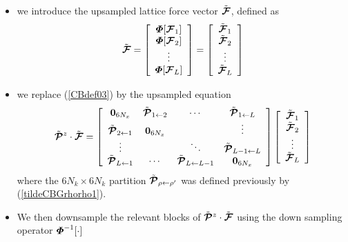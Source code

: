 \begin{itemize}
\item we introduce the upsampled lattice force vector $\tilde{\CB F}$, 
defined as
\[
\tilde{\CB F}=
\left[\begin{array}{c}
{\bmi \Phi}[{\CB F}_{1}]\\ {\bmi \Phi}[{\CB F}_{2}]\\
\vdots\\
{\bmi \Phi}[{\CB F}_{L}]  \end{array}  \right]
=
\left[\begin{array}{c}
\tilde{\CB F}_{1}\\ \tilde{\CB F}_{2}\\
\vdots\\
\tilde{\CB F}_{L}  \end{array}  \right]
\]
\item we replace  (\ref{CBdef03})  by the upsampled equation
\begin{equation} \label{tildeCBdef3}
\tilde{\CB P}{}^{z}\cdot \tilde{\CB F}=\left[{\begin{array}{cccc}
{\bf 0}_{6N_x}&\tilde{\CB P}_{1 
\leftarrow   2}&\cdots &\tilde{\CB P}_{1 \leftarrow   L}\\ \tilde{\CB P}_{2 
\leftarrow   1}&{\bf 0}_{6N_x}&&\vdots\\ 
\vdots&&\ddots&\tilde{\CB P}_{L-1 \leftarrow   L}\\ \tilde{\CB P}_{L \leftarrow   
1}&\cdots &\tilde{\CB P}_{L \leftarrow   L-1}&{\bf 0}_{6N_x}\end{array}}\right] 
\left[\begin{array}{c}
\tilde{\CB F}_{1}\\ \tilde{\CB F}_{2}\\
\vdots\\
\tilde{\CB F}_{L}  \end{array}  \right]
\end{equation}
where the $6 N_k \times 6 N_k$ partition $\tilde{\CB P}_{\rho 
\leftarrow   \rho^{\prime}}$ was defined previously by 
(\ref{tildeCBGrhorho1}).

\item We then downsample the relevant blocks of $\tilde{\CB P}{}^{z}\cdot 
\tilde{\CB F}$ using the down sampling operator ${\bmi \Phi}^{-1}[\cdot]$
\end{itemize}

